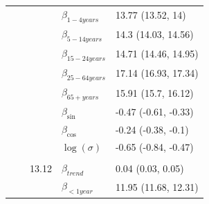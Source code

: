 \documentclass[a4paper,twoside,11pt]{report} %
\theoremstyle{definition}
\theoremstyle{definition}
\theoremstyle{definition}
\theoremstyle{definition}
\theoremstyle{remark}
\begin{document}
\begin{longtable}[t]{llrll}
\hspace{1em}\hspace{1em} &  &  & $\beta_{1-4 years}$ & 13.77 (13.52, 14)\\

\hspace{1em}\hspace{1em} &  &  & $\beta_{5-14 years}$ & 14.3 (14.03, 14.56)\\

\hspace{1em}\hspace{1em} &  &  & $\beta_{15-24 years}$ & 14.71 (14.46, 14.95)\\

\hspace{1em}\hspace{1em} &  &  & $\beta_{25-64 years}$ & 17.14 (16.93, 17.34)\\

\hspace{1em}\hspace{1em} &  &  & $\beta_{65+ years}$ & 15.91 (15.7, 16.12)\\

\hspace{1em}\hspace{1em} &  &  & $\beta_{\sin}$ & -0.47 (-0.61, -0.33)\\

\hspace{1em}\hspace{1em}\hspace{1em}\hspace{1em} &  &  & $\beta_{\cos}$ & -0.24 (-0.38, -0.1)\\

\hspace{1em}\hspace{1em} &  &  & $\log(\sigma)$ & -0.65 (-0.84, -0.47)\\
\cmidrule{2-5}
\addlinespace[0.3em]
\multicolumn{5}{l}{\begin{math}\log(\lambda_{it})=\beta(ageGroup_{i})+\beta_{trend} t + \beta_{\sin} \sin\Big(\frac{\pi\cdot \tau_{t}}{6}\Big) + \beta_{\cos} \cos\Big(\frac{\pi \cdot \tau_{t}}{6}\Big)+\log(n_{it})\end{math}}\\
\hspace{1em}\hspace{1em} &  & 13.12 & $\beta_{trend}$ & 0.04 (0.03, 0.05)\\

\hspace{1em}\hspace{1em} &  &  & $\beta_{<1 year}$ & 11.95 (11.68, 12.31)\\


\end{longtable}
\end{document}

